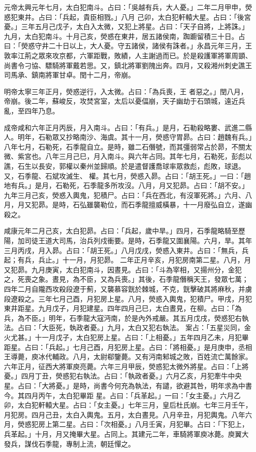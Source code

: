 \begin{pinyinscope}
 元帝太興元年七月，太白犯南斗。占曰：「吳越有兵，大人憂。」二年二月甲申，熒惑犯東井。占曰：「兵起，貴臣相戮。」八月
 己卯，太白犯軒轅大星。占曰：「後宮憂。」三年五月己戊子，太白入太微，又犯上將星。占曰：「天子自將，上將誅。」九月，太白犯南斗。十月己亥，熒惑在東井，居五諸侯南，踟躕留積三十日。占曰：「熒惑守井二十日以上，大人憂。守五諸侯，諸侯有誅者。」永昌元年三月，王敦率江荊之眾來攻京都，六軍距戰，敗績，人主謝過而已。於是殺護軍將軍周顗、尚書令刁協、驃騎將軍戴若思。又，鎮北將軍劉隗出奔。四月，又殺湘州刺史譙王司馬承、鎮南將軍甘卓。閏十二月，帝崩。



 明帝太寧三年正月，熒惑逆行，入太微。占曰：「為兵喪，王
 者惡之。」閏八月，帝崩。後二年，蘇峻反，攻焚宮室，太后以憂偪崩，天子幽劫于石頭城，遠近兵亂，至四年乃息。



 成帝咸和六年正月丙辰，月入南斗。占曰：「有兵。」是月，石勒殺略婁、武進二縣人。明年，石勒眾又抄略南沙、海虞。其十一月，熒惑守胃昴。占曰：趙魏有兵。」八年七月，石勒死，石季龍自立。是時，雖二石僭號，而其彊弱常占於昴，不關太微、紫宮也。八年三月己巳，月入南斗。與六年占同。其年七月，石勒死，彭彪以譙，石生以長安，郭權以秦州並歸順。於是遣督護喬球率眾救彪，彪敗，球退。又，石季龍、石斌攻滅生、
 權。其七月，熒惑入昴。占曰：「胡王死。」一曰：「趙地有兵。」是月，石勒死，石季龍多所攻沒。八月，月又犯昴。占曰：「胡不安。」九年三月己亥，熒惑入輿鬼，犯積尸。占曰：「兵在西北，有沒軍死將。」六月、八月，月又犯昴。是時，石弘雖襲勒位，而石季龍擅威橫暴，十一月廢弘自立，遂幽殺之。



 咸康元年二月己亥，太白犯昴。占曰：「兵起，歲中旱。」四月，石季龍略騎至歷陽，加司徒王道大司馬，治兵列戍衝要。是時，石季龍又圍襄陽。六月，旱。其年三月丙戌，月入昴。占曰：「胡王死。」八月戊戌，熒惑入東井。占曰：「無兵，兵起；有兵，兵止。」十一月，月犯昴。
 二年正月辛亥，月犯房南第二星。八月，月又犯昴。九月庚寅，太白犯南斗，因晝見。占曰：「斗為宰相，又揚州分，金犯之，死喪之象。晝見，為不臣，又為兵喪。」其後，石季龍僭稱天王，發眾七萬；四年二月自隴西攻殺段遼于薊，又襲慕容皝於棘城，不克，皝擊破其將麻秋，并虜段遼殺之。三年七月己酉，月犯房上星。八月，熒惑入輿鬼，犯積尸。甲戌，月犯東井距星。九月戊子，月犯建星。四年四月己巳，太白晝見，在柳。占曰：「為兵，為不臣。」明年，石季龍大寇沔南，於是內外戒嚴。其五月戊戌，熒惑犯右執法。占曰：「大臣死，執政者憂。」九月，太白又犯右執法。
 案占：「五星災同，金火尤甚。」十一月戊子，太白犯房上星。占曰：「上相憂。」五年四月乙未，月犯畢距星。占曰：「兵起。」七月己酉，月犯房上星。占曰：「將相憂。」是月庚申，丞相王導薨，庾冰代輔政。八月，太尉郗鑒薨。又有沔南邾城之敗，百姓流亡萬餘家。六年正月，征西大將軍庾亮薨。六年三月甲辰，熒惑犯太微外將星。占曰：「上將憂。」四月丁丑，熒惑犯右執法。占曰：「執政者憂。」六月乙亥，月犯牽牛中央星。占曰：「大將憂。」是時，尚書今何充為執法，有譴，欲避其咎，明年求為中書今。其四月丙午，太白犯畢距
 星。占曰：「兵革起。」一曰：「女主憂。」六月乙卯，太白犯軒轅大星。占曰：「女主憂。」七年三月，皇后杜氏崩。七年三月壬午，月犯房。四月己丑，太白入輿鬼。五月，太白晝見。八月辛丑，月犯輿鬼。八年六月，熒惑犯房上第二星。占曰：「次相憂。」八月壬寅，月犯畢。占曰：「下犯上，兵革起。」十月，月又掩畢大星。占同上。其建元二年，車騎將軍庾冰薨。庾翼大發兵，謀伐石季龍，專制上流，朝廷憚之。




\end{pinyinscope}
